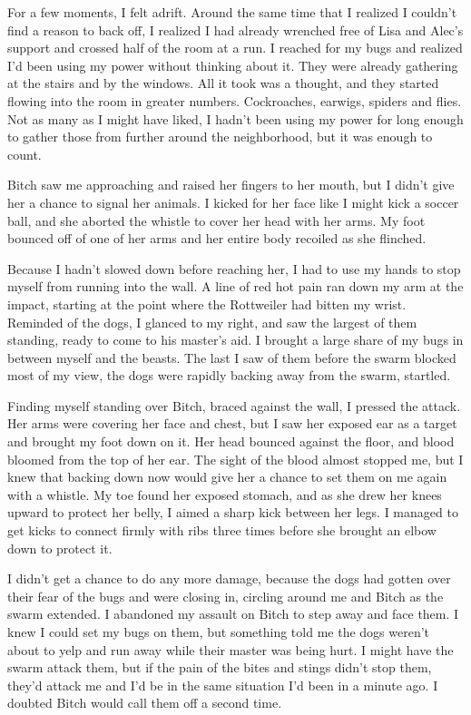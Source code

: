 For a few moments, I felt adrift.  Around the same time that I realized I couldn't find a reason to back off, I realized I had already wrenched free of Lisa and Alec's support and crossed half of the room at a run.  I reached for my bugs and realized I'd been using my power without thinking about it.  They were already gathering at the stairs and by the windows.  All it took was a thought, and they started flowing into the room in greater numbers.  Cockroaches, earwigs, spiders and flies.  Not as many as I might have liked, I hadn't been using my power for long enough to gather those from further around the neighborhood, but it was enough to count.



Bitch saw me approaching and raised her fingers to her mouth, but I didn't give her a chance to signal her animals.  I kicked for her face like I might kick a soccer ball, and she aborted the whistle to cover her head with her arms.  My foot bounced off of one of her arms and her entire body recoiled as she flinched.



Because I hadn't slowed down before reaching her, I had to use my hands to stop myself from running into the wall.  A line of red hot pain ran down my arm at the impact, starting at the point where the Rottweiler had bitten my wrist.  Reminded of the dogs, I glanced to my right, and saw the largest of them standing, ready to come to his master's aid.  I brought a large share of my bugs in between myself and the beasts.  The last I saw of them before the swarm blocked most of my view, the dogs were rapidly backing away from the swarm, startled.



Finding myself standing over Bitch, braced against the wall, I pressed the attack.  Her arms were covering her face and chest, but I saw her exposed ear as a target and brought my foot down on it.  Her head bounced against the floor, and blood bloomed from the top of her ear.  The sight of the blood almost stopped me, but I knew that backing down now would give her a chance to set them on me again with a whistle.  My toe found her exposed stomach, and as she drew her knees upward to protect her belly, I aimed a sharp kick between her legs.  I managed to get kicks to connect firmly with ribs three times before she brought an elbow down to protect it.



I didn't get a chance to do any more damage, because the dogs had gotten over their fear of the bugs and were closing in, circling around me and Bitch as the swarm extended.  I abandoned my assault on Bitch to step away and face them.  I knew I could set my bugs on them, but something told me the dogs weren't about to yelp and run away while their master was being hurt.  I might have the swarm attack them, but if the pain of the bites and stings didn't stop them, they'd attack me and I'd be in the same situation I'd been in a minute ago.  I doubted Bitch would call them off a second time.



